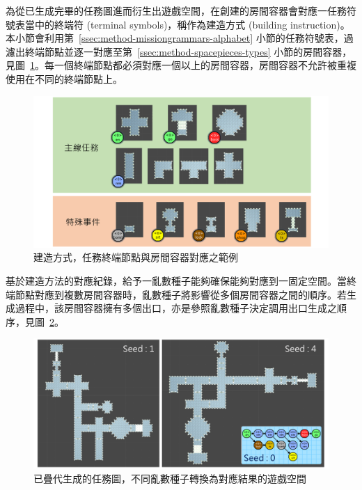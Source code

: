 為從已生成完畢的任務圖進而衍生出遊戲空間，在創建的房間容器會對應一任務符號表當中的終端符 (terminal symbols)，稱作為建造方式 (building instruction)。本小節會利用第~\ref{ssec:method-missiongrammars-alphabet} 小節的任務符號表，過濾出終端節點並逐一對應至第~\ref{ssec:method-spacepieces-types} 小節的房間容器，見圖~\ref{fig:mission-to-space-instruction}。每一個終端節點都必須對應一個以上的房間容器，房間容器不允許被重複使用在不同的終端節點上。

\begin{figure}[ht]
  \begin{center}
    \includegraphics[width=1.0\textwidth]{figures/mission-to-space-instruction.png}
    \caption{建造方式，任務終端節點與房間容器對應之範例} 
    \label{fig:mission-to-space-instruction}
  \end{center}
\end{figure}

基於建造方法的對應紀錄，給予一亂數種子能夠確保能夠對應到一固定空間。當終端節點對應到複數房間容器時，亂數種子將影響從多個房間容器之間的順序。若生成過程中，該房間容器擁有多個出口，亦是參照亂數種子決定調用出口生成之順序，見圖~\ref{fig:mission-to-space-instruction-result}。

\begin{figure}[ht]
  \begin{center}
    \includegraphics[width=1.0\textwidth]{figures/mission-to-space-instruction-result.png}
    \caption{已疊代生成的任務圖，不同亂數種子轉換為對應結果的遊戲空間} 
    \label{fig:mission-to-space-instruction-result}
  \end{center}
\end{figure}

